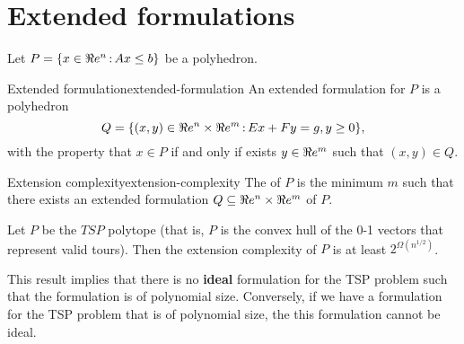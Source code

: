 


\section{Extended formulations}

Let $P=\{x\in\Re e^n{\,:\,} Ax\leq b\}$ be a polyhedron. 

\begin{definition}{Extended formulation}{extended-formulation} An extended formulation for $P$ is a polyhedron 
$$Q=\{(x,y)\in\Re e^n\times\Re e^m{\,:\,} Ex+Fy=g,y\geq0\},$$
with the property that $x\in P$ if and only if exists $y\in \Re e^m$ such that $(x,y)\in Q$.
\end{definition}



\begin{definition}{Extension complexity}{extension-complexity} The  of $P$ is the minimum $m$ such that there exists an extended formulation $Q\subseteq \Re e^n\times \Re e^m$ of $P$.
\end{definition}

\begin{theorem}{}{} Let $P$ be the $TSP$ polytope (that is, $P$ is the convex hull of the 0-1 vectors that represent valid tours). Then the extension complexity of $P$ is at least $2^{\Omega(n^{1/2})}$.
\end{theorem}

\begin{remark}{}{}
This result implies that there is no {\bf ideal} formulation for the TSP problem such that the formulation is of polynomial size. Conversely, if we have a formulation for the TSP problem that is of polynomial size, the this formulation cannot be ideal.
\end{remark}






